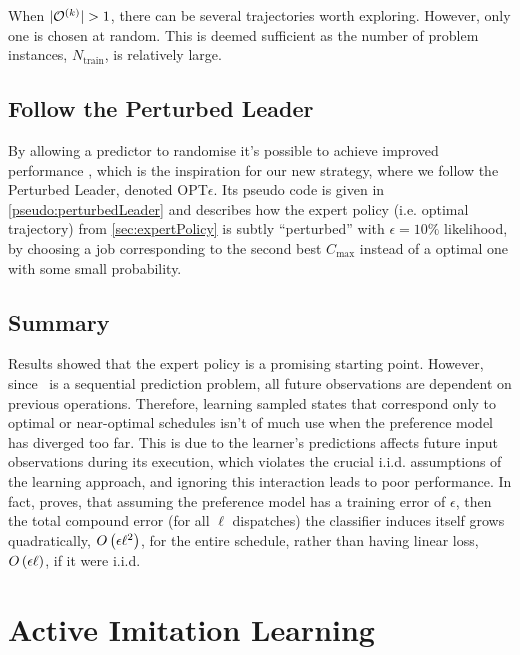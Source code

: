 \documentclass[smallextended]{svjour3}
\begin{document}
When $\lvert\mathcal{O}^{(k)}\rvert>1$, there can be several trajectories worth 
exploring. However, only one is chosen at random. This is deemed sufficient as 
the number of problem instances, $N_{\text{train}}$, is relatively large.

\subsection{Follow the Perturbed Leader}\label{sec:perturbedLeader}
By allowing a predictor to randomise it's possible to achieve improved 
performance \cite{CesaBianchi06,Hannan57}, which is the inspiration for our new 
strategy, where we follow the Perturbed Leader, denoted OPT$\epsilon$. 
Its pseudo code is given in \cref{pseudo:perturbedLeader} and describes how the 
expert policy (i.e. optimal trajectory) from \cref{sec:expertPolicy} is subtly
``perturbed'' with $\epsilon=10\%$ likelihood, by choosing a job corresponding 
to the second best $C_{\max}$ instead of a optimal one with some small 
probability. 



\subsection{Summary}

Results showed that the expert policy is a promising starting point. 
However, since \jsp\ is a sequential prediction problem, all future 
observations are dependent on previous operations. 
Therefore, learning sampled states that correspond only to optimal or 
near-optimal schedules isn't of much use when the preference model has 
diverged too far. 
This is due to the learner's predictions affects future input observations 
during its execution, which violates the crucial i.i.d. assumptions of the  
learning approach, and ignoring this interaction leads to poor performance.
In fact, \cite{RossB10} proves, that assuming the preference model has a 
training error of $\epsilon$, then the total compound error (for all $\ell$ 
dispatches) the classifier induces itself grows quadratically, ${O}\left(\epsilon 
  \ell^2\right)$, for the entire schedule, rather than having linear loss, 
${O}\left(\epsilon \ell\right)$, if it were i.i.d.


\section{Active Imitation Learning}\label{sec:il}
\end{document}
